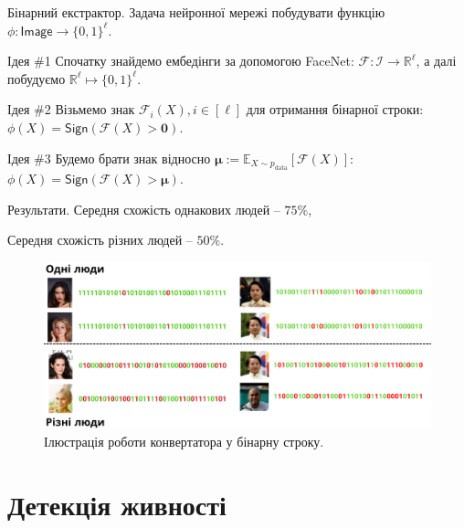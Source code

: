 \documentclass[xcolor={usenames,dvipsnames}]{beamer}
\begin{document}
    \begin{frame}{Бінарний екстрактор.}
        Задача нейронної мережі побудувати функцію $\phi: \mathsf{Image} \to \{0,1\}^{\ell}$.

        \begin{block}{Ідея \#1}
        Спочатку знайдемо ембедінги за допомогою FaceNet: $\mathcal{F}: \mathcal{I} \to \mathbb{R}^{\ell}$, а далі побудуємо $\mathbb{R}^{\ell} \mapsto \{0,1\}^{\ell}$.
        \end{block}

        \begin{block}{Ідея \#2}
        Візьмемо знак $\mathcal{F}_i(X),i \in [\ell]$ для отримання бінарної строки: $\phi(X) = \mathsf{Sign}\left(\mathcal{F}(X) > \boldsymbol{0}\right)$.
        \end{block}

        \begin{block}{Ідея \#3}
        Будемо брати знак відносно $\boldsymbol{\mu} := \mathbb{E}_{X \sim p_{\text{data}}}[\mathcal{F}(X)]$: $\phi(X) = \mathsf{Sign}\left(\mathcal{F}(X) > \boldsymbol{\mu}\right)$.
        \end{block}
    \end{frame}

    \begin{frame}{Результати.}
        Середня схожість однакових людей -- $75\%$, 
        
        Середня схожість різних людей -- $50\%$.
        \begin{figure}
        \centering
            \includegraphics[width=\textwidth]{images/fuzzy_res.png}
            \caption{Ілюстрація роботи конвертатора у бінарну строку.}
        \end{figure}
    \end{frame}

    \section{Детекція живності}
\end{document}
